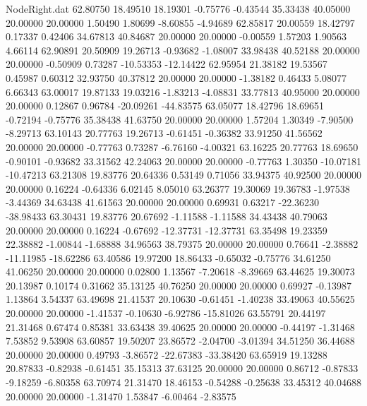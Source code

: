 \begin{filecontents}{NodeRight.dat}
  62.80750   18.49510   18.19301    -0.75776   -0.43544   35.33438   40.05000   20.00000   20.00000    1.50490    1.80699   -8.60855   -4.94689
  62.85817   20.00559   18.42797     0.17337    0.42406   34.67813   40.84687   20.00000   20.00000   -0.00559    1.57203    1.90563    4.66114
  62.90891   20.50909   19.26713    -0.93682   -1.08007   33.98438   40.52188   20.00000   20.00000   -0.50909    0.73287  -10.53353  -12.14422
  62.95954   21.38182   19.53567     0.45987    0.60312   32.93750   40.37812   20.00000   20.00000   -1.38182    0.46433    5.08077    6.66343
  63.00017   19.87133   19.03216    -1.83213   -4.08831   33.77813   40.95000   20.00000   20.00000    0.12867    0.96784  -20.09261  -44.83575
  63.05077   18.42796   18.69651    -0.72194   -0.75776   35.38438   41.63750   20.00000   20.00000    1.57204    1.30349   -7.90500   -8.29713
  63.10143   20.77763   19.26713    -0.61451   -0.36382   33.91250   41.56562   20.00000   20.00000   -0.77763    0.73287   -6.76160   -4.00321
  63.16225   20.77763   18.69650    -0.90101   -0.93682   33.31562   42.24063   20.00000   20.00000   -0.77763    1.30350  -10.07181  -10.47213
  63.21308   19.83776   20.64336     0.53149    0.71056   33.94375   40.92500   20.00000   20.00000    0.16224   -0.64336    6.02145    8.05010
  63.26377   19.30069   19.36783    -1.97538   -3.44369   34.63438   41.61563   20.00000   20.00000    0.69931    0.63217  -22.36230  -38.98433
  63.30431   19.83776   20.67692    -1.11588   -1.11588   34.43438   40.79063   20.00000   20.00000    0.16224   -0.67692  -12.37731  -12.37731
  63.35498   19.23359   22.38882    -1.00844   -1.68888   34.96563   38.79375   20.00000   20.00000    0.76641   -2.38882  -11.11985  -18.62286
  63.40586   19.97200   18.86433    -0.65032   -0.75776   34.61250   41.06250   20.00000   20.00000    0.02800    1.13567   -7.20618   -8.39669
  63.44625   19.30073   20.13987     0.10174    0.31662   35.13125   40.76250   20.00000   20.00000    0.69927   -0.13987    1.13864    3.54337
  63.49698   21.41537   20.10630    -0.61451   -1.40238   33.49063   40.55625   20.00000   20.00000   -1.41537   -0.10630   -6.92786  -15.81026
  63.55791   20.44197   21.31468     0.67474    0.85381   33.63438   39.40625   20.00000   20.00000   -0.44197   -1.31468    7.53852    9.53908
  63.60857   19.50207   23.86572    -2.04700   -3.01394   34.51250   36.44688   20.00000   20.00000    0.49793   -3.86572  -22.67383  -33.38420
  63.65919   19.13288   20.87833    -0.82938   -0.61451   35.15313   37.63125   20.00000   20.00000    0.86712   -0.87833   -9.18259   -6.80358
  63.70974   21.31470   18.46153    -0.54288   -0.25638   33.45312   40.04688   20.00000   20.00000   -1.31470    1.53847   -6.00464   -2.83575

\end{filecontents}
